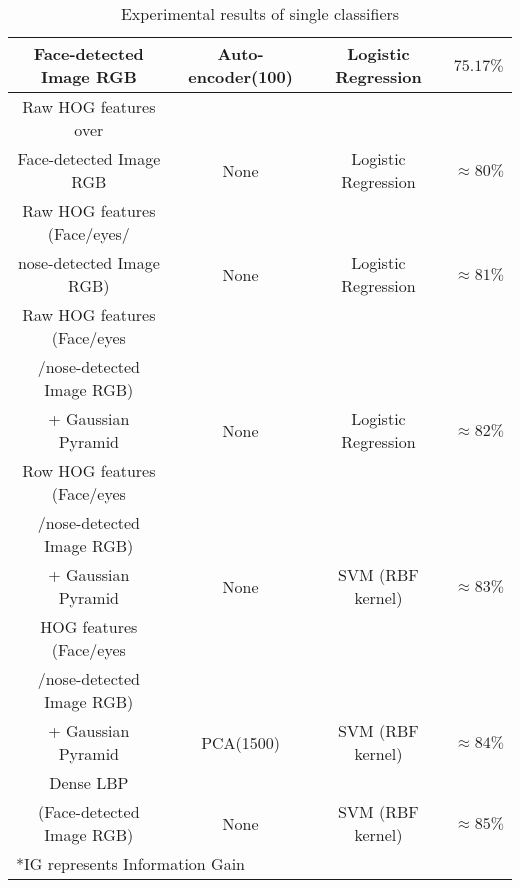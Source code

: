 \begin{table}[h!]
\begin{tabular*}{\textwidth}{c @{\extracolsep{\fill}}ccc}
Face-detected Image RGB & Auto-encoder(100) & Logistic Regression & $75.17\%$ \\ \hline
Raw HOG features over &  &  &\\
Face-detected Image RGB & None & Logistic Regression &  $\approx 80\%$  \\  \hline
Raw HOG features (Face/eyes/ & & & \\ 
nose-detected Image RGB) & None & Logistic Regression & $\approx 81\%$ \\ \hline
Raw HOG features (Face/eyes & & & \\ 
/nose-detected Image RGB) & & &\\ 
+ Gaussian Pyramid & None & Logistic Regression & $\approx 82\%$  \\ \hline
Row HOG features (Face/eyes & & &\\
/nose-detected Image RGB) & & & \\ 
+ Gaussian Pyramid & None &  SVM (RBF kernel) & $\approx 83\%$  \\ \hline
HOG features (Face/eyes & & &\\
/nose-detected Image RGB) & & & \\ 
+ Gaussian Pyramid & PCA(1500) & SVM (RBF kernel) & $\approx 84\%$  \\ \hline
Dense LBP  & & & \\
(Face-detected Image RGB) & None & SVM (RBF kernel) & $\approx 85\%$  \\ 
\hline
\multicolumn{4}{l}{*IG represents Information Gain} \\
\hline
\end{tabular*}
\caption{Experimental results of single classifiers}
\label{Table 1}
\end{table}

